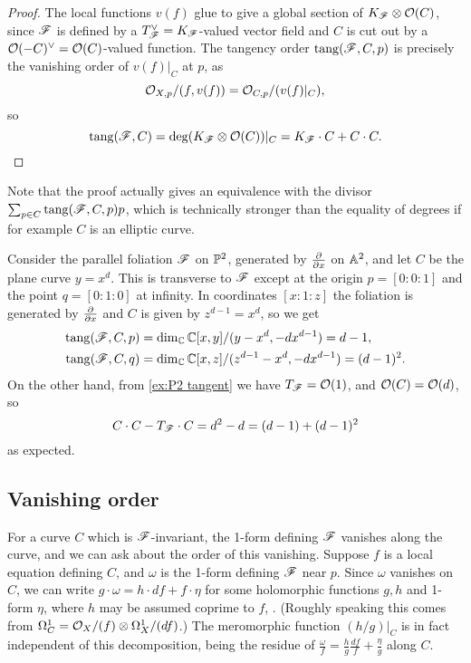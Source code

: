 \begin{proof}
    The local functions $v(f)$ glue to give a global section of
    $K_\scrF\otimes\O(C)$, since $\scrF$ is defined by a
    $T_\scrF^\vee=K_\scrF$-valued vector field and $C$ is cut out by a
    $\O(-C)^\vee=\O(C)$-valued function. The tangency order $\tang(\scrF,C,p)$ is
    precisely the vanishing order of $v(f)|_C$ at $p$, as
    \begin{equation*}
        \O_{X,p}/(f,v(f)) = \O_{C,p}/(v(f)|_C),
    \end{equation*}
    so
    \begin{equation*}
        \tang(\scrF,C)
            = \deg(K_\scrF\otimes\O(C))|_C
            = K_\scrF\cdot C + C\cdot C.
    \end{equation*}
\end{proof}

\begin{remark}
    Note that the proof actually gives an equivalence with the divisor
    $\sum_{p\in C}\tang(\scrF,C,p)p$, which is technically stronger than the
    equality of degrees if for example $C$ is an elliptic curve.
\end{remark}

\begin{example}
    Consider the parallel foliation $\scrF$ on $\P^2$, generated by $\pdv{}{x}$
    on $\A^2$, and let $C$ be the plane curve $y=x^d$. This is transverse to
    $\scrF$ except at the origin $p=[0:0:1]$ and the point $q=[0:1:0]$ at
    infinity. In coordinates $[x:1:z]$ the foliation is generated by $\pdv{}{x}$
    and $C$ is given by $z^{d-1}=x^d$, so we get
    \begin{align*}
        \tang(\scrF,C,p) &= \dim_\C\C[x,y]/(y-x^d,-dx^{d-1}) = d-1, \\
        \tang(\scrF,C,q) &= \dim_\C\C[x,z]/(z^{d-1}-x^d,-dx^{d-1}) = (d-1)^2.
    \end{align*}
    On the other hand, from \cref{ex:P2 tangent} we have $T_\scrF=\O(1)$, and
    $\O(C)=\O(d)$, so
    \begin{equation*}
        C\cdot C - T_\scrF\cdot C = d^2 - d = (d-1) + (d-1)^2
    \end{equation*}
    as expected.
\end{example}

\subsection{Vanishing order}

For a curve $C$ which is $\scrF$-invariant, the 1-form defining $\scrF$ vanishes
along the curve, and we can ask about the order of this vanishing. Suppose $f$
is a local equation defining $C$, and $\omega$ is the 1-form defining $\scrF$
near $p$. Since $\omega$ vanishes on $C$, we can write
$g\cdot\omega=h\cdot df+f\cdot\eta$ for some holomorphic functions $g,h$ and
1-form $\eta$, where $h$ may be assumed coprime to $f$, \cite{neto_86}. (Roughly
speaking this comes from $\Omega^1_C=\O_X/(f)\otimes\Omega^1_X/(df)$.) The
meromorphic function $(h/g)|_C$ is in fact independent of this decomposition,
being the residue of $\frac{\omega}{f}=\frac{h}{g}\frac{df}{f}+\frac{\eta}{g}$
along $C$.

